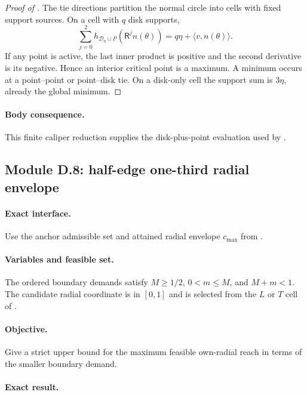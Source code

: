 \begin{proof}[Proof of ]
The tie directions partition the normal circle into cells with fixed support
sources.  On a cell with $q$ disk supports,
\[
 \sum_{j=0}^2h_{\mathcal D_\eta\cup P}(\mathsf R^jn(\theta))
 =
 q\eta+\langle v,n(\theta)\rangle.
\]
If any point is active, the last inner product is positive and the second
derivative is its negative.  Hence an interior critical point is a maximum.
A minimum occurs at a point--point or point--disk tie.  On a disk-only cell
the support sum is $3\eta$, already the global minimum.
\end{proof}

\paragraph{Body consequence.}
This finite caliper reduction supplies the disk-plus-point evaluation used
by .

\subsection{Module D.8: half-edge one-third radial envelope}

\paragraph{Exact interface.}
Use the anchor admissible set and attained radial envelope $c_{\max}$ from
.

\paragraph{Variables and feasible set.}
The ordered boundary demands satisfy
$M\ge1/2$, $0<m\le M$, and $M+m<1$.  The candidate radial coordinate is in
$[0,1]$ and is selected from the $L$ or $T$ cell of
.

\paragraph{Objective.}
Give a strict upper bound for the maximum feasible own-radial reach in terms
of the smaller boundary demand.

\paragraph{Exact result.}

